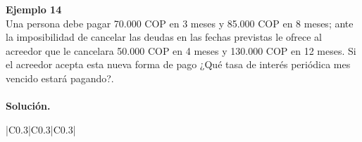 \textbf{Ejemplo 14}\\
Una persona debe pagar 70.000 COP en 3 meses y 85.000 COP en 8 meses; ante la imposibilidad de cancelar las deudas en las fechas previstas le ofrece al acreedor que le cancelara 50.000 COP en 4 meses y 130.000 COP en 12 meses. Si el acreedor acepta esta nueva forma de pago ¿Qué tasa de interés periódica mes vencido estará pagando?.\\ \\
\setlength{\parskip}{-1mm}
\textbf{Solución.}

\begin{center}
  \renewcommand{\arraystretch}{1.5}%
  \begin{longtable}[H]{|C{0.3\linewidth}|C{0.3\linewidth}|C{0.3\linewidth}|}
    \hline
                                                          \\ \hline
                                                                      \\ \hline
     \\ \hline
     \\ \hline


\end{longtable}
\end{center}
